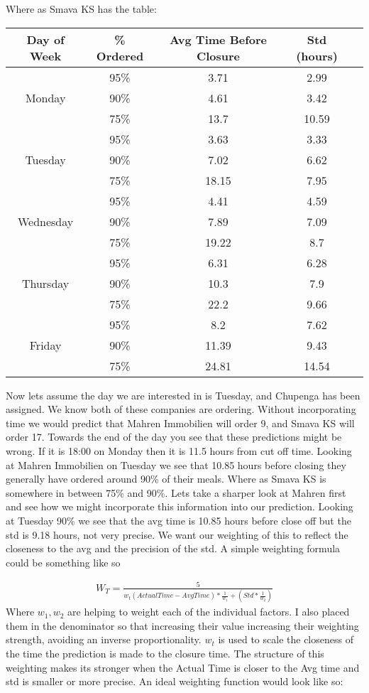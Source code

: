 \documentclass[12pt]{article}
\newcommand{\ban}[1]{ \begin{align*}#1\end{align*} }
\begin{document}
Where as Smava KS has the table:
\begin{center}
\begin{tabular}{ |c|c|c|c|c| } 
\hline
Day of Week & \% Ordered & Avg Time Before Closure & Std (hours) \\
\hline
\multirow{3}{4em}{Monday}
& 95\% & 3.71 & 2.99 \\ 
& 90\% & 4.61 & 3.42 \\ 
& 75\% & 13.7 & 10.59 \\ 
\hline
\multirow{3}{4em}{Tuesday}
& 95\% & 3.63 & 3.33 \\ 
& 90\% & 7.02 & 6.62 \\ 
& 75\% & 18.15 & 7.95 \\ 
\hline
\multirow{3}{4em}{Wednesday}
& 95\% & 4.41 & 4.59 \\ 
& 90\% & 7.89 & 7.09 \\ 
& 75\% & 19.22 & 8.7 \\ 
\hline
\multirow{3}{4em}{Thursday}
& 95\% & 6.31 & 6.28 \\ 
& 90\% & 10.3 & 7.9 \\ 
& 75\% & 22.2 & 9.66 \\ 
\hline
\multirow{3}{4em}{Friday}
& 95\% & 8.2 & 7.62 \\ 
& 90\% & 11.39 & 9.43 \\ 
& 75\% & 24.81 & 14.54 \\ 
\hline
\end{tabular}
\end{center}

Now lets assume the day we are interested in is Tuesday, and Chupenga has been assigned. We know both of these companies are ordering. Without incorporating time we would predict that Mahren Immobilien will order 9, and Smava KS will order 17. Towards the end of the day you see that these predictions might be wrong. If it is 18:00 on Monday then it is 11.5 hours from cut off time. Looking at Mahren Immobilien on Tuesday we see that 10.85 hours before closing they generally have ordered around 90\% of their meals. Where as Smava KS is somewhere in between 75\% and 90\%. Lets take a sharper look at Mahren first and see how we might incorporate this information into our prediction. 
Looking at Tuesday 90\% we see that the avg time is 10.85 hours before close off but the std is 9.18 hours, not very precise. We want our weighting of this to reflect the closeness to the avg and the precision of the std. A simple weighting formula could be something like so

\ban{
W_T = \frac{5}{w_t(ActualTime-AvgTime)*\frac{1}{w_1}+(Std*\frac{1}{w_2})}
}
Where $w_1, w_2$ are helping to weight each of the individual factors. I also placed them in the denominator so that increasing their value increasing their weighting strength, avoiding an inverse proportionality. $w_t$ is used to scale the closeness of the time the prediction is made to the closure time. The structure of this weighting makes its stronger when the Actual Time is closer to the Avg time and std is smaller or more precise. An ideal weighting function would look like so:
\end{document}
